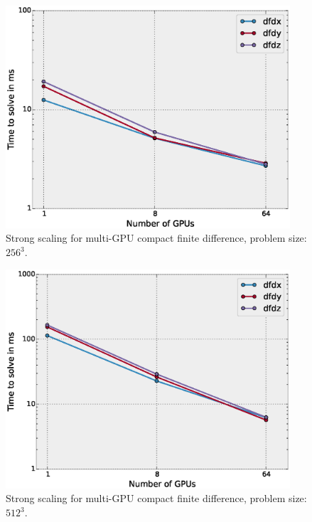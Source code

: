 \documentclass{elsarticle}
\begin{document}
\begin{figure}[h!]
\begin{center}
\includegraphics[width=300pt]{fig/strong-scaling-256.eps}
\caption{Strong scaling for multi-GPU compact finite difference, problem size: $256^3$.}
\label{fig:strong-scaling-256}
\end{center}
\end{figure}

\begin{figure}[h!]
\begin{center}
\includegraphics[width=300pt]{fig/strong-scaling-512.eps}
\caption{Strong scaling for multi-GPU compact finite difference, problem size: $512^3$.}
\label{fig:strong-scaling-512}
\end{center}
\end{figure}
\end{document}
